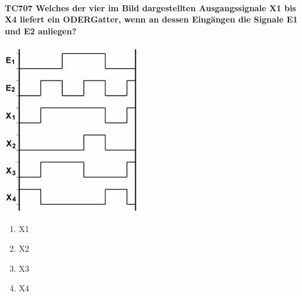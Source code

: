 \documentclass[8pt]{article}
\begin{document}
\begin{enumerate}
\begin{enumerate}[nolistsep,label=\Alph*]
{\begin{enumerate}[nolistsep,label=\Alph*]
\paragraph*{TC707 Welches der vier im Bild dargestellten Ausgangssignale X1 bis X4 liefert ein ODERGatter, wenn an dessen Eingängen die Signale E1 und E2 anliegen?}
\begin{center}
	\begin{minipage}{\linewidth}
		\centering
		\includegraphics[scale=1.0]{pics/tc707_a.jpg}
	\end{minipage}
\end{center}
\begin{enumerate}[nolistsep,label=\Alph*]
\item X1
\item X2
\item X3
\item X4
\end{enumerate}


\end{enumerate}}
\end{enumerate}
\end{enumerate}
\end{document}
